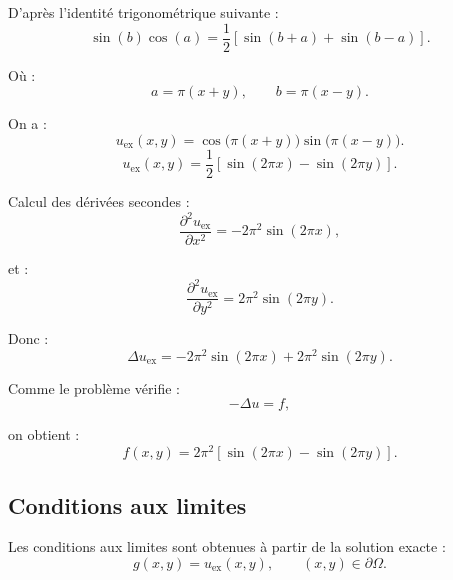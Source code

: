 \documentclass[12pt,a4paper]{article}
\begin{document}
	D'après l'identité trigonométrique suivante :
	\begin{equation*}
	\sin(b)\cos(a)
	=
	\frac{1}{2}\left[\sin(b+a)+\sin(b-a)\right].
	\end{equation*}
	
	Où :
	\begin{equation*}
	a=\pi(x+y),
	\qquad
	b=\pi(x-y).
	\end{equation*}
	
	On a :
	\begin{equation*}
	u_{\mathrm{ex}}(x,y)
	=
	\cos\bigl(\pi(x+y)\bigr)\sin\bigl(\pi(x-y)\bigr).
	\end{equation*}
	\begin{equation*}
	u_{\mathrm{ex}}(x,y)
	=
	\frac{1}{2}
	\left[
	\sin(2\pi x)
	-
	\sin(2\pi y)
	\right].
	\end{equation*}
	
	Calcul des dérivées secondes :
	\begin{equation*}
	\frac{\partial^2 u_{\mathrm{ex}}}{\partial x^2}
	=
	-2\pi^2 \sin(2\pi x),
	\end{equation*}
	
	et :
	\begin{equation*}
	\frac{\partial^2 u_{\mathrm{ex}}}{\partial y^2}
	=
	2\pi^2 \sin(2\pi y).
	\end{equation*}
	
	Donc :
	\begin{equation*}
	\Delta u_{\mathrm{ex}}
	=
	-2\pi^2 \sin(2\pi x)
	+
	2\pi^2 \sin(2\pi y).
	\end{equation*}
	
	Comme le problème vérifie :
	\begin{equation*}
	-\Delta u=f,
	\end{equation*}
	
	on obtient :
	\begin{equation*}
	\boxed{
		f(x,y)
		=
		2\pi^2\left[\sin(2\pi x)-\sin(2\pi y)\right].
	}
	\end{equation*}
	
	\subsection{Conditions aux limites}
	
	Les conditions aux limites sont obtenues à partir de la solution exacte :
	\begin{equation*}
	g(x,y)=u_{\mathrm{ex}}(x,y),
	\qquad (x,y)\in \partial\Omega.
	\end{equation*}
	
\end{document}
